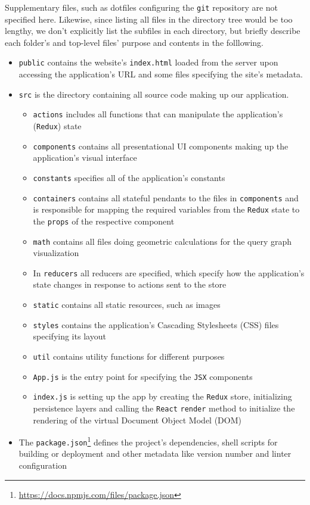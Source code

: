 Supplementary files, such as dotfiles configuring the \texttt{git} repository are not specified here. Likewise, since listing all files in the directory tree would be too lengthy, we don't explicitly list the subfiles in each directory, but briefly describe each folder's and top-level files' purpose and contents in the folllowing.

\begin{itemize}
    \item \texttt{public} contains the website's \texttt{index.html} loaded from the server upon accessing the application's URL and some files specifying the site's metadata.
    \item \texttt{src} is the directory containing all source code making up our application.
    \begin{itemize}
        \item \texttt{actions} includes all functions that can manipulate the application's (\texttt{Redux}) state
        \item \texttt{components} contains all presentational UI components making up the application's visual interface
        \item \texttt{constants} specifies all of the application's constants
        \item \texttt{containers} contains all stateful pendants to the files in \texttt{components} and is responsible for mapping the required variables from the \texttt{Redux} state to the \texttt{props} of the respective component
        \item \texttt{math} contains all files doing geometric calculations for the query graph visualization
        \item In \texttt{reducers} all reducers are specified, which specify how the application's state changes in response to actions sent to the store
        \item \texttt{static} contains all static resources, such as images
        \item \texttt{styles} contains the application's Cascading Stylesheets (CSS) files specifying its layout
        \item \texttt{util} contains utility functions for different purposes
        \item \texttt{App.js} is the entry point for specifying the \texttt{JSX} components
        \item \texttt{index.js} is setting up the app by creating the \texttt{Redux} store, initializing persistence layers and calling the \texttt{React} \texttt{render} method to initialize the rendering of the virtual Document Object Model (DOM)
    \end{itemize}
    \item The \texttt{package.json}\footnote{\url{https://docs.npmjs.com/files/package.json}} defines the project's dependencies, shell scripts for building or deployment and other metadata like version number and linter configuration
\end{itemize}

